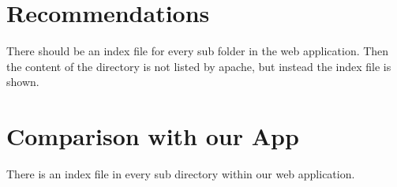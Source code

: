\section{Recommendations}
There should be an index file for every sub folder in the web application. Then the content of the directory is not listed by apache, but instead the index file is shown.

\section{Comparison with our App}
There is an index file in every sub directory within our web application.
